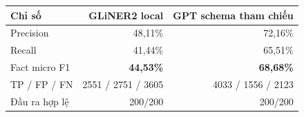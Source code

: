 \begin{tabularx}{\linewidth}{@{}Yrr@{}}
\toprule
\textbf{Chỉ số} & \textbf{GLiNER2 local} & \textbf{GPT schema tham chiếu} \\\midrule
Precision & 48,11\% & 72,16\% \\
Recall & 41,44\% & 65,51\% \\
Fact micro F1 & \textbf{44,53\%} & \textbf{68,68\%} \\
TP / FP / FN & 2551 / 2751 / 3605 & 4033 / 1556 / 2123 \\
Đầu ra hợp lệ & 200/200 & 200/200 \\
\bottomrule
\end{tabularx}
